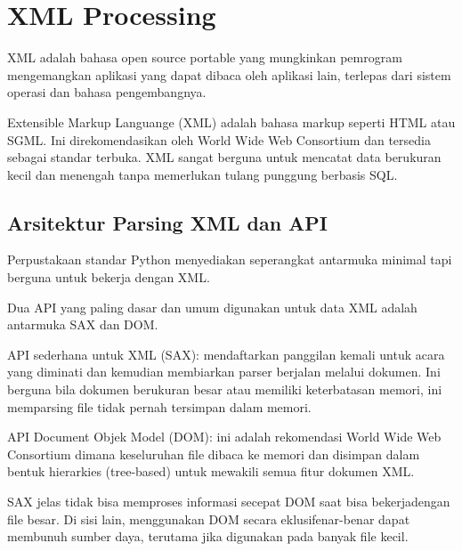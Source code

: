 

\section{XML Processing} 
\hspace*{0.5in} XML adalah bahasa open source portable yang mungkinkan pemrogram mengemangkan aplikasi yang dapat dibaca oleh aplikasi lain, terlepas dari sistem operasi dan bahasa pengembangnya. 
\vspace{12pt}
 
\hspace*{0.5in} Extensible Markup Languange (XML) adalah bahasa markup seperti HTML atau SGML. Ini direkomendasikan oleh World Wide Web Consortium dan tersedia sebagai standar terbuka. XML sangat berguna untuk mencatat data berukuran kecil dan menengah tanpa memerlukan tulang punggung berbasis SQL. 

\vspace{12pt}
\subsection{Arsitektur Parsing XML dan API} 
 
\hspace*{0.5in} Perpustakaan standar Python menyediakan seperangkat antarmuka minimal tapi berguna untuk bekerja dengan XML.  
 
\hspace*{0.5in} Dua API yang paling dasar dan umum digunakan untuk data XML adalah antarmuka SAX dan DOM. 
 
\hspace*{0.5in} API sederhana untuk XML (SAX): mendaftarkan panggilan kemali untuk acara yang diminati dan kemudian membiarkan parser berjalan melalui dokumen. Ini berguna bila dokumen berukuran besar atau memiliki keterbatasan memori, ini memparsing file tidak pernah tersimpan dalam memori. 
 
\hspace*{0.5in} API Document Objek Model (DOM): ini adalah rekomendasi World Wide Web Consortium dimana keseluruhan file dibaca ke memori dan disimpan dalam bentuk hierarkies (tree-based) untuk mewakili semua fitur dokumen XML.  
 
\hspace*{0.5in} SAX jelas tidak bisa memproses informasi secepat DOM saat bisa bekerjadengan file besar. Di sisi lain, menggunakan DOM secara eklusifenar-benar dapat membunuh sumber daya, terutama jika digunakan pada banyak file kecil. 
 

